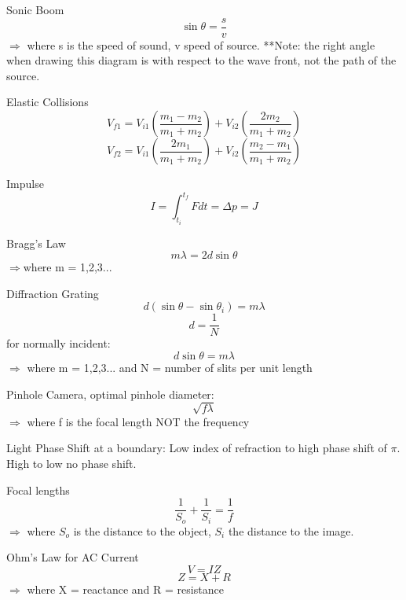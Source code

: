 \documentclass{article}
\begin{document}
Sonic Boom\begin{equation}\sin{\theta} = \frac{s}{v}\end{equation}
$\Rightarrow$ where s is the speed of sound, v speed of source.  **Note: the right angle when drawing this diagram is with respect to the wave front, not the path of the source.

Elastic Collisions\begin{equation}V_{f1}=V_{i1}(\frac{m_1-m_2}{m_1+m_2})+V_{i2}(\frac{2m_2}{m_1+m_2})\end{equation}
\begin{equation}V_{f2}=V_{i1}(\frac{2m_1}{m_1+m_2})+V_{i2}(\frac{m_2-m_1}{m_1+m_2})\end{equation}

Impulse\begin{equation}I = \int_{t_i}^{t_f} Fdt = \Delta p = J \end{equation}

Bragg's Law\begin{equation} m\lambda = 2d\sin{\theta}\end{equation}
$\Rightarrow$where m = 1,2,3...

Diffraction Grating\begin{equation}d(\sin{\theta}-\sin{\theta_i}) = m\lambda \end{equation}
\begin{equation}d = \frac{1}{N}\end{equation}
for normally incident:
\begin{equation}d\sin{\theta} = m\lambda\end{equation}
$\Rightarrow$ where m = 1,2,3... and N = number of slits per unit length

Pinhole Camera, optimal pinhole diameter:\begin{equation}\sqrt{f\lambda}\end{equation}
$\Rightarrow$ where f is the focal length NOT the frequency

Light Phase Shift at a boundary: Low index of refraction to high phase shift of $\pi$.  High to low no phase shift.

Focal lengths\begin{equation}\frac{1}{S_o}+\frac{1}{S_i} = \frac{1}{f}\end{equation}
$\Rightarrow$ where $S_o$ is the distance to the object, $S_i$ the distance to the image.

Ohm's Law for AC Current\begin{equation}V = IZ\end{equation}
\begin{equation}Z = X + R\end{equation}
$\Rightarrow$ where X = reactance and R = resistance
 
\end{document}
